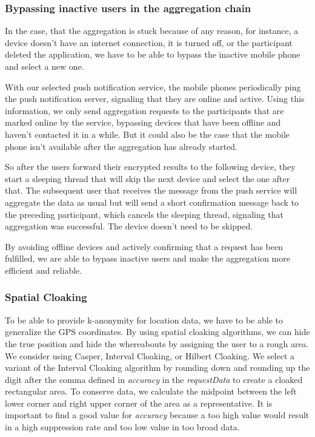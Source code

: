 \subsubsection{Bypassing inactive users in the aggregation chain}
In the case, that the aggregation is stuck because of any reason, for instance, a device doesn't have an internet connection, it is turned off, or the participant deleted the application, we have to be able to bypass the inactive mobile phone and select a new one.

With our selected push notification service, the mobile phones periodically ping the push notification server, signaling that they are online and active. Using this information, we only send aggregation requests to the participants that are marked online by the service, bypassing devices that have been offline and haven't contacted it in a while. But it could also be the case that the mobile phone isn't available after the aggregation has already started.

So after the users forward their encrypted results to the following device, they start a sleeping thread that will skip the next device and select the one after that. The subsequent user that receives the message from the push service will aggregate the data as usual but will send a short confirmation message back to the preceding participant, which cancels the sleeping thread, signaling that aggregation was successful. The device doesn't need to be skipped.

By avoiding offline devices and actively confirming that a request has been fulfilled, we are able to bypass inactive users and make the aggregation more efficient and reliable.

\subsubsection{Spatial Cloaking}
To be able to provide k-anonymity for location data, we have to be able to generalize the GPS coordinates. By using spatial cloaking algorithms, we can hide the true position and hide the whereabouts by assigning the user to a rough area. We consider using Casper, Interval Cloaking, or Hilbert Cloaking. We select a variant of the Interval Cloaking algorithm by rounding down and rounding up the digit after the comma defined in \textit{accuracy} in the \textit{requestData} to create a cloaked rectangular area. To conserve data, we calculate the midpoint between the left lower corner and right upper corner of the area as a representative. It is important to find a good value for \textit{accuracy} because a too high value would result in a high suppression rate and too low value in too broad data. 

